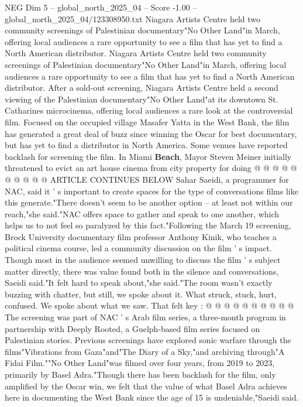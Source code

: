 \begin{textsample}{NEG Dim 5 – global\_north\_2025\_04 – Score -1.00 – global\_north\_2025\_04/123308950.txt}  \label{ex:f5_neg_363}
Niagara Artists Centre held two community screenings of Palestinian documentary"No Other Land"in March, offering local audiences a rare opportunity to see a film that has yet to find a North American distributor.
Niagara Artists Centre held two community screenings of Palestinian documentary"No Other Land"in March, offering local audiences a rare opportunity to see a film that has yet to find a North American distributor.
After a sold-out screening, Niagara Artists Centre held a second viewing of the Palestinian documentary"No Other Land"at its downtown St.
Catharines microcinema, offering local audiences a rare look at the controversial film.
Focused on the occupied village Masafer Yatta in the West Bank, the film has generated a great deal of buzz since winning the Oscar for best documentary, but has yet to find a distributor in North America.
Some venues have reported backlash for screening the film.
In Miami \textbf{Beach}, Mayor Steven Meiner initially threatened to evict an art house cinema from city property for doing @ @ @ @ @ @ @ @ @ @ ARTICLE CONTINUES BELOW Sahar Saeidi, a programmer for NAC, said it ' s important to create spaces for the type of conversations films like this generate."There doesn't seem to be another option -- at least not within our reach,"she said."NAC offers space to gather and speak to one another, which helps us to not feel so paralyzed by this fact."Following the March 19 screening, Brock University documentary film professor Anthony Kinik, who teaches a political cinema course, led a community discussion on the film ' s impact.
Though most in the audience seemed unwilling to discuss the film ' s subject matter directly, there was value found both in the silence and conversations, Saeidi said."It felt hard to speak about,"she said."The room wasn't exactly buzzing with chatter, but still, we spoke about it.
What struck, stuck, hurt, confused.
We spoke about what we saw.
That felt key : @ @ @ @ @ @ @ @ @ @ The screening was part of NAC ' s Arab film series, a three-month program in partnership with Deeply Rooted, a Guelph-based film series focused on Palestinian stories.
Previous screenings have explored sonic warfare through the films"Vibrations from Gaza"and"The Diary of a Sky,"and archiving through"A Fidai Film.""No Other Land"was filmed over four years, from 2019 to 2023, primarily by Basel Adra."Though there has been backlash for the film, only amplified by the Oscar win, we felt that the value of what Basel Adra achieves here in documenting the West Bank since the age of 15 is undeniable,"Saeidi said.

\end{textsample}
